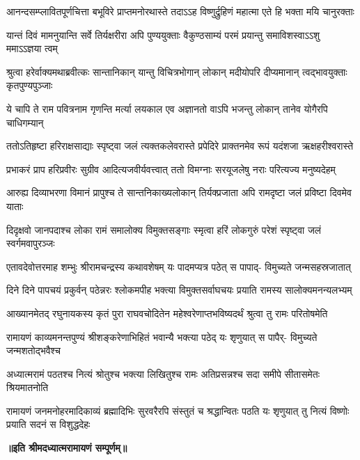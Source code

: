 \fourlineindentedshloka
{आनन्दसम्प्लावितपूर्णचित्ता}
{बभूविरे प्राप्तमनोरथास्ते}
{तदाऽऽह विष्णुर्द्रुहिणं महात्मा}
{एते हि भक्ता मयि चानुरक्ताः} %

\fourlineindentedshloka
{यान्तं दिवं मामनुयान्ति सर्वे}
{तिर्यक्षरीरा अपि पुण्ययुक्ताः}
{वैकुण्ठसाम्यं परमं प्रयान्तु}
{समाविशस्वाऽऽशु ममाऽऽज्ञया त्वम्} %

\fourlineindentedshloka
{श्रुत्वा हरेर्वाक्यमथाब्रवीत्कः}
{सान्तानिकान् यान्तु विचित्रभोगान्}
{लोकान् मदीयोपरि दीप्यमानान्}
{त्वद्भावयुक्ताः कृतपुण्यपुञ्जाः} %

\fourlineindentedshloka
{ये चापि ते राम पवित्रनाम}
{गृणन्ति मर्त्या लयकाल एव}
{अज्ञानतो वाऽपि भजन्तु लोकान्}
{तानेव योगैरपि चाधिगम्यान्} %

\fourlineindentedshloka
{ततोऽतिहृष्टा हरिराक्षसाद्याः}
{स्पृष्ट्वा जलं त्यक्तकलेवरास्ते}
{प्रपेदिरे प्राक्तनमेव रूपं}
{यदंशजा ऋक्षहरीश्वरास्ते} %

\fourlineindentedshloka
{प्रभाकरं प्राप हरिप्रवीरः}
{सुग्रीव आदित्यजवीर्यवत्त्वात्}
{ततो विमग्नाः सरयूजलेषु}
{नराः परित्यज्य मनुष्यदेहम्} %

\fourlineindentedshloka
{आरुह्य दिव्याभरणा विमानं}
{प्रापुश्च ते सान्तनिकाख्यलोकान्}
{तिर्यक्प्रजाता अपि रामदृष्टा}
{जलं प्रविष्टा दिवमेव याताः} %

\fourlineindentedshloka
{दिदृक्षवो जानपदाश्च लोका}
{रामं समालोक्य विमुक्तसङ्गाः}
{स्मृत्वा हरिं लोकगुरुं परेशं}
{स्पृष्ट्वा जलं स्वर्गमवापुरञ्जः} %

\fourlineindentedshloka
{एतावदेवोत्तरमाह शम्भुः}
{श्रीरामचन्द्रस्य कथावशेषम्}
{यः पादमप्यत्र पठेत् स पापाद्-}
{विमुच्यते जन्मसहस्रजातात्} %

\fourlineindentedshloka
{दिने दिने पापचयं प्रकुर्वन्}
{पठेन्नरः श्लोकमपीह भक्त्या}
{विमुक्तसर्वाघचयः प्रयाति}
{रामस्य सालोक्यमनन्यलभ्यम्} %

\fourlineindentedshloka
{आख्यानमेतद् रघुनायकस्य}
{कृतं पुरा राघवचोदितेन}
{महेश्वरेणाप्तभविष्यदर्थं}
{श्रुत्वा तु रामः परितोषमेति} %

\fourlineindentedshloka
{रामायणं काव्यमनन्तपुण्यं}
{श्रीशङ्करेणाभिहितं भवान्यै}
{भक्त्या पठेद् यः शृणुयात् स पापैर्-}
{विमुच्यते जन्मशतोद्भवैश्च} %

\fourlineindentedshloka
{अध्यात्मरामं पठतश्च नित्यं}
{श्रोतुश्च भक्त्या लिखितुश्च रामः}
{अतिप्रसन्नश्च सदा समीपे}
{सीतासमेतः श्रियमातनोति} %

\fourlineindentedshloka
{रामायणं जनमनोहरमादिकाव्यं}
{ब्रह्मादिभिः सुरवरैरपि संस्तुतं च}
{श्रद्धान्वितः पठति यः शृणुयात् तु नित्यं}
{विष्णोः प्रयाति सदनं स विशुद्धदेहः} %



\textbf{॥इति श्रीमदध्यात्मरामायणं सम्पूर्णम्॥}
